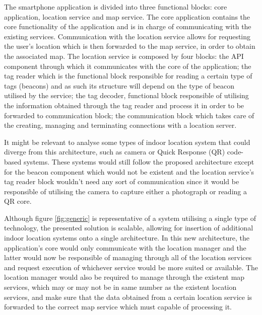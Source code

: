 The smartphone application is divided into three functional blocks: core application, location service and map service. The core application contains the core functionality of the application and is in charge of communicating with the existing services. Communication with the location service allows for requesting the user's location which is then forwarded to the map service, in order to obtain the associated map. The location service is composed by four blocks: the API component through which it communicates with the core of the application; the tag reader which is the functional block responsible for reading a certain type of tags (beacons) and as such its structure will depend on the type of beacon utilised by the service; the tag decoder, functional block responsible of utilising the information obtained through the tag reader and process it in order to be forwarded to communication block; the communication block which takes care of the creating, managing and terminating connections with a location server.

It might be relevant to analyse some types of indoor location system that could diverge from this architecture, such as camera or Quick Response (QR) code-based systems. These systems would still follow the proposed architecture except for the beacon component which would not be existent and the location service's tag reader block wouldn't need any sort of communication since it would be responsible of utilising the camera to capture either a photograph or reading a QR core.




Although figure \ref{fig:generic} is representative of a system utilising a single type of technology, the presented solution is scalable, allowing for insertion of additional indoor location systems onto a single architecture. In this new architecture, the application's core would only communicate with the location manager and the latter would now be responsible of managing through all of the location services and request execution of whichever service would be more suited or available. The location manager would also be required to manage through the existent map services, which may or may not be in same number as the existent location services, and make sure that the data obtained from a certain location service is forwarded to the correct map service which must capable of processing it.






